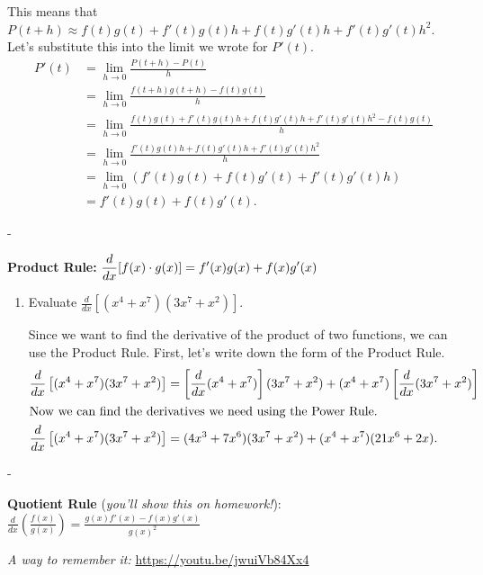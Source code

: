 \documentclass{article}
\makeatletter
\newlength{\tipmargin}
\renewenvironment{framed}{
  \setlength{\tipmargin}{\textwidth-\linewidth}
  \advance\@totalleftmargin-\tipmargin
  \def\FrameCommand{\hspace{\tipmargin}\fbox}%
  \advance\linewidth\tipmargin
  \MakeFramed {\advance\hsize-\width \FrameRestore}%
}
{\endMakeFramed}
\makeatother
\begin{document}
\begin{enumerate}
\begin{enumerate}
\begin{enumerate}
\begin{solution}
        This means that $P(t+h) \approx f(t)g(t) + f'(t)g(t)h + f(t)g'(t)h + f'(t)g'(t)h^2$.
        Let's substitute this into the limit we wrote for $P'(t)$. 
        \begin{align*}
        P'(t) &= \lim_{h \to 0} \frac{P(t+h)-P(t)}{h} \\
        &=  \lim_{h \to 0} \frac{f(t+h)g(t+h)-f(t)g(t)}{h} \\
        &= \lim_{h \to 0} 
        \frac{f(t)g(t) + f'(t)g(t)h + f(t)g'(t)h + f'(t)g'(t)h^2 - f(t)g(t)}{h} \\
        &= \lim_{h \to 0} \frac{f'(t)g(t)h + f(t)g'(t)h + f'(t)g'(t)h^2}{h} \\
        &= \lim_{h \to 0} (f'(t)g(t) + f(t)g'(t) + f'(t)g'(t)h) \\
        &= f'(t)g(t) + f(t)g'(t).
      \end{align*}
      \end{solution}
    \end{enumerate}

  \end{enumerate}

\end{enumerate}
\begin{framed}
  \textbf{Product Rule:} $\displaystyle \frac{d}{dx} [f(x) \cdot g(x)] = 
  f'(x) g(x) + f(x)g'(x)$
\end{framed}

\pspace{\newpage}

\begin{enumerate}[resume, topsep=0pt]
\item 
  \begin{problem}[\vfill]
    Evaluate $\displaystyle \frac{d}{dx} \left[(x^4 + x^7) (3x^7 + x^2) \right]$.
  \end{problem}

  \begin{solution}
    Since we want to find the derivative of the product of two functions, we can use the
    Product Rule. First, let's write down the form of the Product Rule.
    \begin{align*}
      \frac{d}{dx} \left[(x^4 + x^7) (3x^7 + x^2) \right] &=
      \left[\frac{d}{dx} (x^4 + x^7)\right] (3x^7 + x^2) + 
      (x^4 + x^7) \left[\frac{d}{dx} (3x^7 + x^2)\right] \\
      \intertext{Now we can find the derivatives we need using the Power Rule.}
      \frac{d}{dx} \left[(x^4 + x^7) (3x^7 + x^2) \right] 
      &= (4x^3+7x^6)(3x^7 + x^2) + (x^4 + x^7)(21x^6 + 2x).
    \end{align*}
  \end{solution}

\end{enumerate}
\begin{framed}
  \textbf{Quotient Rule} (\emph{you'll show this on homework!}): $\displaystyle \frac{d}{dx} \left( \frac{f(x)}{g(x)} \right) = \frac{g(x) f'(x) - f(x)g'(x)}{g(x)^2}$

  \emph{A way to remember it:} \url{https://youtu.be/jwuiVb84Xx4}
\end{framed}
\end{document}
